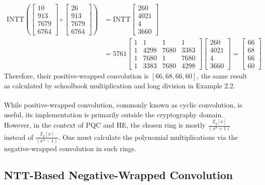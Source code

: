 \documentclass[12pt]{report}
\begin{document}
\begin{align*}
    \text{INTT}\left(\begin{bmatrix}10\\913\\7679\\6764\end{bmatrix} \circ \begin{bmatrix}26\\913\\7679\\6764\end{bmatrix}\right) &= \text{INTT}\begin{bmatrix}260\\4021\\4\\3660\end{bmatrix} \\
    &= 5761 \begin{bmatrix}
    1 & 1 & 1 & 1 \\
    1 & 4298 & 7680 & 3383 \\
    1 & 7680 & 1 & 7680 \\
    1 & 3383 & 7680 & 4298
    \end{bmatrix}\begin{bmatrix}260\\4021\\4\\3660\end{bmatrix} = \begin{bmatrix}66\\68\\66\\60\end{bmatrix}
\end{align*}
Therefore, their positive-wrapped convolution is $[66,68,66,60]$, the same result as calculated by schoolbook multiplication and long division in Example 2.2.\\ \\
While positive-wrapped convolution, commonly known as cyclic convolution, is useful, its implementation is primarily outside the cryptography domain. However, in the context of PQC and HE, the chosen ring is mostly $\frac{\mathbb{Z}_{q}[x]}{(x^{n}+1)}$ instead of $\frac{\mathbb{Z}_{q}[x]}{(x^{n}-1)}$. One must calculate the polynomial multiplications via the negative-wrapped convolution in such rings.

\subsection{NTT-Based Negative-Wrapped Convolution}
\end{document}
